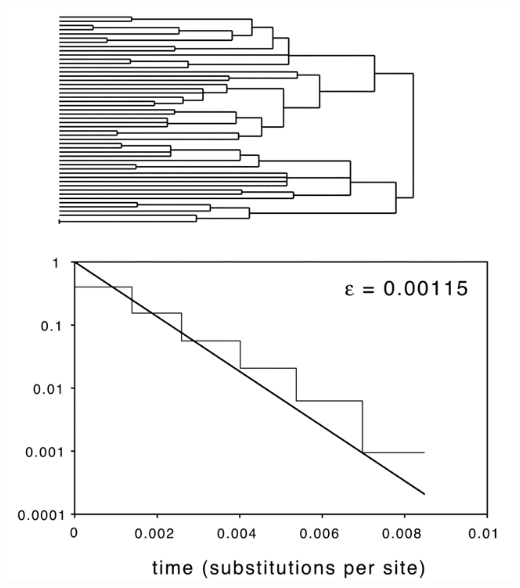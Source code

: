 \begin{frame}
\begin{columns}[b]
\includegraphics[scale=0.2]{../common/images/genSkylineExponential}

\end{columns}

\end{frame}


